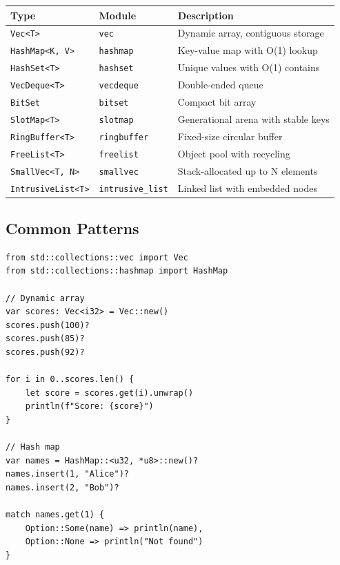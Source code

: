 \begin{center}
\begin{tabular}{llp{6cm}}
\textbf{Type} & \textbf{Module} & \textbf{Description} \\
\hline
\texttt{Vec<T>} & \texttt{vec} & Dynamic array, contiguous storage \\
\texttt{HashMap<K, V>} & \texttt{hashmap} & Key-value map with O(1) lookup \\
\texttt{HashSet<T>} & \texttt{hashset} & Unique values with O(1) contains \\
\texttt{VecDeque<T>} & \texttt{vecdeque} & Double-ended queue \\
\texttt{BitSet} & \texttt{bitset} & Compact bit array \\
\texttt{SlotMap<T>} & \texttt{slotmap} & Generational arena with stable keys \\
\texttt{RingBuffer<T>} & \texttt{ringbuffer} & Fixed-size circular buffer \\
\texttt{FreeList<T>} & \texttt{freelist} & Object pool with recycling \\
\texttt{SmallVec<T, N>} & \texttt{smallvec} & Stack-allocated up to N elements \\
\texttt{IntrusiveList<T>} & \texttt{intrusive\_list} & Linked list with embedded nodes \\
\end{tabular}
\end{center}

\subsection{Common Patterns}

\begin{lstlisting}
from std::collections::vec import Vec
from std::collections::hashmap import HashMap

// Dynamic array
var scores: Vec<i32> = Vec::new()
scores.push(100)?
scores.push(85)?
scores.push(92)?

for i in 0..scores.len() {
    let score = scores.get(i).unwrap()
    println(f"Score: {score}")
}

// Hash map
var names = HashMap::<u32, *u8>::new()?
names.insert(1, "Alice")?
names.insert(2, "Bob")?

match names.get(1) {
    Option::Some(name) => println(name),
    Option::None => println("Not found")
}
\end{lstlisting}


